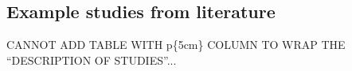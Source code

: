 \subsection{Example studies from literature}

CANNOT ADD TABLE WITH p\{5cm\} COLUMN TO WRAP THE ``DESCRIPTION OF STUDIES''...